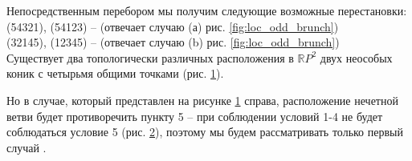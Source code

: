 \documentclass[14pt]{article}
\begin{document}
Непосредственным перебором мы получим следующие возможные перестановки:\\
(54321), (54123) – (отвечает случаю (а) рис. \ref{fig:loc_odd_brunch})\\ 
(32145), (12345) – (отвечает случаю (b) рис. \ref{fig:loc_odd_brunch})\\

Существует два топологически различных расположения в $\mathbb RP^2$ двух неособых коник с четырьмя общими точками (рис. \ref{fig:intersection_of_ovals}).

\begin{figure}[H]
\caption{}
\label{fig:intersection_of_ovals}
\end{figure}

Но в случае, который представлен на рисунке \ref{fig:intersection_of_ovals} справа, расположение нечетной ветви будет противоречить пункту 5 -- при соблюдении условий 1-4 не будет соблюдаться условие 5 (рис. \ref{fig:prohibit_second_inters_ovals}),  поэтому мы будем рассматривать только первый случай .

\begin{figure}[H]
\caption{}
\label{fig:prohibit_second_inters_ovals}
\end{figure}
\end{document}
